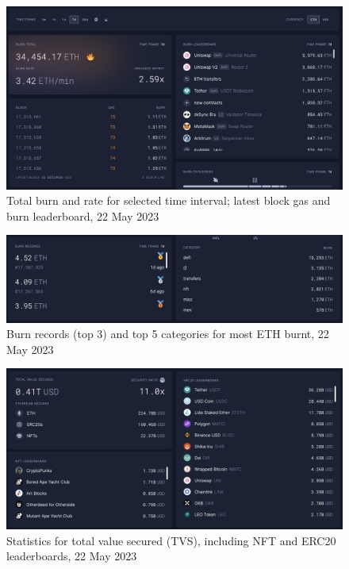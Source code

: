 \documentclass[UTF8]{article}
\begin{document}
{\begin{figure}[htbp]
\begin{center}
\includegraphics[width=0.9\linewidth]{images/totalburn}
\caption{Total burn and rate for selected time interval; latest block gas and burn leaderboard, 22 May 2023}
\label{fig:totalburn}
\end{center}
\end{figure}

\begin{figure}[htbp]
\begin{center}
\includegraphics[width=0.9\linewidth]{images/records}
\caption{Burn records (top 3) and top 5 categories for most ETH burnt, 22 May 2023}
\label{fig:records}
\end{center}
\end{figure}

\begin{figure}[htbp]
\begin{center}
\includegraphics[width=0.9\linewidth]{images/tvs}
\caption{Statistics for total value secured (TVS), including NFT and ERC20 leaderboards, 22 May 2023}
\label{fig:tvs}
\end{center}
\end{figure}

}
\end{document}
